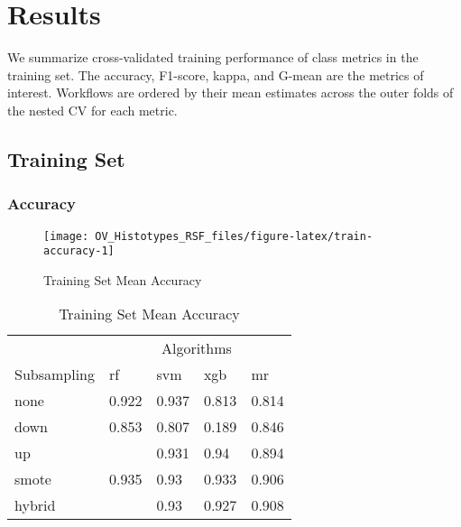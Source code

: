 \documentclass[
]{report}
\begin{document}
\hypertarget{results}{%
\chapter{Results}\label{results}}

We summarize cross-validated training performance of class metrics in the training set. The accuracy, F1-score, kappa, and G-mean are the metrics of interest. Workflows are ordered by their mean estimates across the outer folds of the nested CV for each metric.

\hypertarget{training-set}{%
\section{Training Set}\label{training-set}}

\hypertarget{accuracy-1}{%
\subsection{Accuracy}\label{accuracy-1}}

\begin{figure}[H]

{\centering \texttt{[image: OV\_Histotypes\_RSF\_files/figure-latex/train-accuracy-1]} 

}

\caption{Training Set Mean Accuracy}\label{fig:train-accuracy}
\end{figure}

\begin{table}

\caption{\label{tab:train-accuracy-table}Training Set Mean Accuracy}
\centering
\begin{tabular}[t]{l|l|l|l|l}
\hline
\multicolumn{1}{c|}{ } & \multicolumn{4}{c}{Algorithms} \\
\cline{2-5}
Subsampling & rf & svm & xgb & mr\\
\hline
none & 0.922 & 0.937 & 0.813 & 0.814\\
\hline
down & 0.853 & 0.807 & 0.189 & 0.846\\
\hline
up & \cellcolor[HTML]{90ee90}{0.941} & 0.931 & 0.94 & 0.894\\
\hline
smote & 0.935 & 0.93 & 0.933 & 0.906\\
\hline
hybrid & \cellcolor[HTML]{90ee90}{0.941} & 0.93 & 0.927 & 0.908\\
\hline
\end{tabular}
\end{table}
\end{document}
